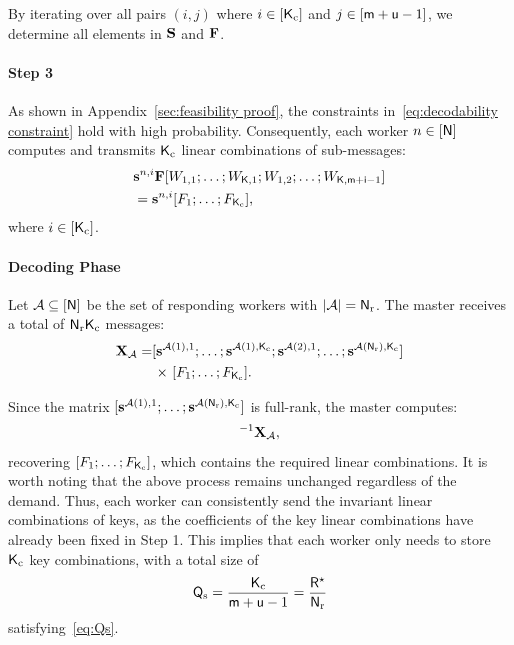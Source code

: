 \documentclass[conference,letterpaper]{IEEEtran}
\begin{document}
By iterating over all pairs \((i,j)\) where \( i \in [{\sf K}_{\rm c}] \) and \( j \in [{\sf m}+{\sf u}-1] \), we determine all elements in \({\bf S}\) and \({\bf F}\).



\paragraph*{Step 3}
As shown in Appendix~\ref{sec:feasibility proof}, the constraints in~\eqref{eq:decodability constraint} hold with high probability. Consequently, each worker \( n \in [{\sf N}] \) computes and transmits \({\sf K}_{\rm c}\) linear combinations of sub-messages:
\begin{align}
\begin{aligned}
&{\bf s}^{n,i} {\bf F} [W_{1,1}; \ldots; W_{{\sf K},1}; W_{1,2}; \ldots; W_{{\sf K},{\sf m}+{\sf i}-1}] \\
&= {\bf s}^{n,i}[{F_1}; \ldots; {F_{{\sf K}_{\rm c}}}],
\end{aligned}
\end{align}
where \( i \in [{\sf K}_{\rm c}] \).

\paragraph*{Decoding Phase}
Let ${\cal A} \subseteq [{\sf N}]$ be the set of responding workers with $ |{\cal A}| = {\sf N}_{\rm r} $. The master receives a total of ${\sf N}_{\rm r}{\sf K}_{\rm c}$ messages:
\begin{align}
{\bf X}_{{\cal A}} =
&[{\bf s}^{{\cal A}(1),1}; \ldots; {\bf s}^{{\cal A}(1),{\sf K}_{\rm c}}; {\bf s}^{{\cal A}(2),1}; \ldots; {\bf s}^{{\cal A}({\sf N}_{\rm r}),{\sf K}_{\rm c}}]  \nonumber \\
& \text{ × } [{F_1}; \ldots; {F_{{\sf K}_{\rm c}}}].
\end{align}

Since the matrix \([{\bf s}^{{\cal A}(1),1}; \ldots; {\bf s}^{{\cal A}({\sf N}_{\rm r}),{\sf K}_{\rm c}}]\) is full-rank, the master computes:
\begin{align}
[\sv^{\Ac(1),1}; \ldots; \sv^{\Ac(\Nsf_{\rm r}),\Ksf_{\rm c}}]^{-1} {\bf X}_{\Ac},
\end{align}
recovering \([{F_1}; \ldots; {F_{{\sf K}_{\rm c}}}]\), which contains the required linear combinations.
It is worth noting that the above process remains unchanged regardless of the demand. Thus, each worker can consistently send the invariant linear combinations of keys, as the coefficients of the key linear combinations have already been fixed in Step 1. This implies that each worker only needs to store \({\sf K}_{\rm c}\) key combinations, with a total size of
\begin{align}
    {\sf Q}_{\rm s} = \frac{{\sf K}_{\rm c}}{{\sf m} + {\sf u} - 1} = \frac{{\sf R}^{\star}}{{\sf N}_{\rm r}}
\end{align}
satisfying~\eqref{eq:Qs}.
\end{document}

